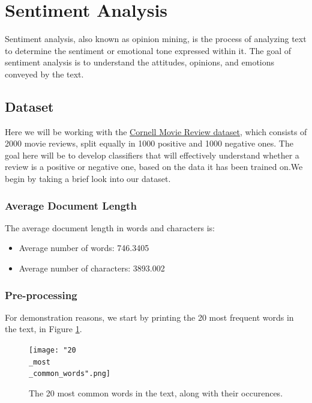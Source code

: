 \documentclass[10pt, a4paper]{article}
\begin{document}
	
	\section{Sentiment Analysis}
	
	Sentiment analysis, also known as opinion mining, is the process of analyzing text to determine the sentiment or emotional tone expressed within it. The goal of sentiment analysis is to understand the attitudes, opinions, and emotions conveyed by the text. 
	
	
	\subsection{Dataset}
	Here we will be working with the \href{http://www.cs.cornell.edu/people/pabo/movie-review-data/}{Cornell Movie Review dataset}, which consists of 2000 movie reviews, split equally in 1000 positive and 1000 negative ones. The goal here will be to develop classifiers that will effectively understand whether a review is a positive or negative one, based on the data it has been trained on.We begin by taking a brief look into our dataset.
	
	
	\subsubsection{Average Document Length }
	
	The average document length in words and characters is:
	\begin{itemize}
		\item Average number of words: 746.3405
		\item Average number of characters: 3893.002
	\end{itemize}
	
	
	
	
	\subsubsection{Pre-processing}
	
	For demonstration reasons, we start by printing the 20 most frequent words in the text, in Figure \ref{fig::20_common}.
	
	\begin{figure}
		\centering
		\texttt{[image: "20\\\_most\\\_common\_words".png]}
		\caption{The 20 most common words in the text, along with their occurences.}
		\label{fig::20_common}
	\end{figure}
	
\end{document}

